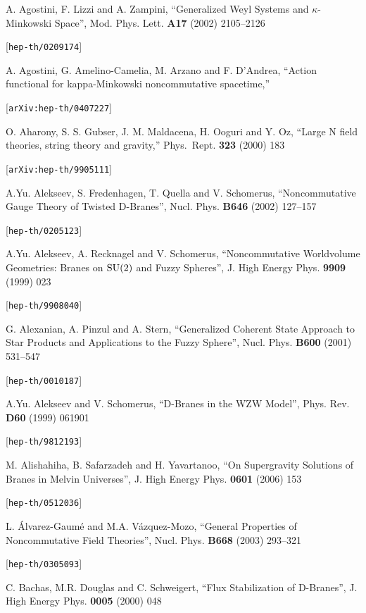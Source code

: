 \begin{thebibliography}{200} 

 A. Agostini, F. Lizzi and A. Zampini, ``Generalized Weyl Systems
  and $\kappa$-Minkowski Space'', Mod. Phys. Lett. {\bf A17} (2002) 2105--2126
  
  [{\tt hep-th/0209174}]

 A. Agostini, G. Amelino-Camelia, M. Arzano and F.
  D'Andrea, ``Action functional for kappa-Minkowski noncommutative spacetime,''

 [{\tt arXiv:hep-th/0407227}]

 O. Aharony, S. S. Gubser, J. M. Maldacena, H. Ooguri
  and Y. Oz, ``Large N field theories, string theory and gravity,'' Phys.\ Rept.
  {\bf 323} (2000) 183 

 [{\tt arXiv:hep-th/9905111}]

 A.Yu. Alekseev, S. Fredenhagen, T. Quella and V. Schomerus,
  ``Noncommutative Gauge Theory of Twisted D-Branes'', Nucl. Phys. {\bf B646}
  (2002) 127--157 

 [{\tt hep-th/0205123}]

 A.Yu. Alekseev, A. Recknagel and V. Schomerus, ``Noncommutative
  Worldvolume Geometries: Branes on ${\rm SU}(2)$ and Fuzzy Spheres'', J. High
  Energy Phys. {\bf 9909} (1999) 023 

 [{\tt hep-th/9908040}]

 G. Alexanian, A. Pinzul and A. Stern, ``Generalized Coherent
  State Approach to Star Products and Applications to the Fuzzy Sphere'', Nucl.
  Phys. {\bf B600} (2001) 531--547 

 [{\tt hep-th/0010187}]

 A.Yu. Alekseev and V. Schomerus, ``D-Branes in the WZW Model'',
  Phys. Rev. {\bf D60} (1999) 061901 

 [{\tt hep-th/9812193}]

 M. Alishahiha, B. Safarzadeh and H. Yavartanoo, ``On Supergravity
  Solutions of Branes in Melvin Universes'', J. High Energy Phys. {\bf 0601}
  (2006) 153 

 [{\tt hep-th/0512036}]

 L. \'Alvarez-Gaum\'e and M.A. V\'azquez-Mozo, ``General
  Properties of Noncommutative Field Theories'', Nucl. Phys. {\bf B668} (2003)
  293--321 

 [{\tt hep-th/0305093}]

 C. Bachas, M.R. Douglas and C. Schweigert, ``Flux Stabilization
  of D-Branes'', J. High Energy Phys. {\bf 0005} (2000) 048 


\end{thebibliography}
